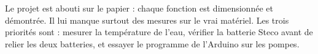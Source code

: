 \begin{aretenir}
Le projet est abouti sur le papier : chaque fonction est dimensionnée et démontrée. Il lui manque surtout des mesures sur le vrai matériel. Les trois priorités sont : mesurer la température de l'eau, vérifier la batterie Steco avant de relier les deux batteries, et essayer le programme de l'Arduino sur les pompes.
\end{aretenir}

